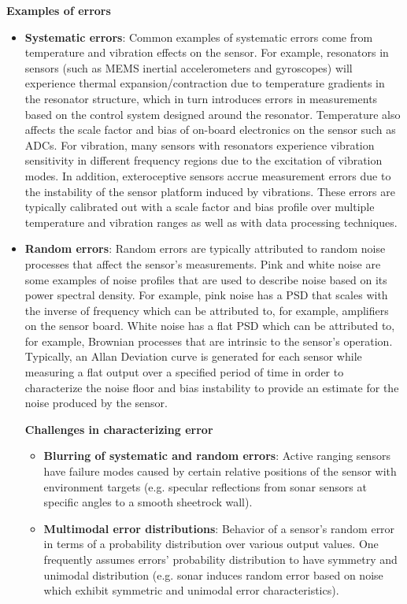\textbf{Examples of errors}
\begin{itemize}
    \item \textbf{Systematic errors}: Common examples of systematic errors come from temperature and vibration effects on the sensor.  For example, resonators in sensors (such as MEMS inertial accelerometers and gyroscopes) will experience thermal expansion/contraction due to temperature gradients in the resonator structure, which in turn introduces errors in measurements based on the control system designed around the resonator.  Temperature also affects the scale factor and bias of on-board electronics on the sensor such as ADCs.  For vibration, many sensors with resonators experience vibration sensitivity in different frequency regions due to the excitation of vibration modes.  In addition, exteroceptive sensors accrue measurement errors due to the instability of the sensor platform induced by vibrations.  These errors are typically calibrated out with a scale factor and bias profile over multiple temperature and vibration ranges as well as with data processing techniques.  
    \item \textbf{Random errors}: Random errors are typically attributed to random noise processes that affect the sensor's measurements.  Pink and white noise are some examples of noise profiles that are used to describe noise based on its power spectral density.  For example, pink noise has a PSD that scales with the inverse of frequency which can be attributed to, for example, amplifiers on the sensor board.  White noise has a flat PSD which can be attributed to, for example, Brownian processes that are intrinsic to the sensor's operation.  Typically, an Allan Deviation curve is generated for each sensor while measuring a flat output over a specified period of time in order to characterize the noise floor and bias instability to provide an estimate for the noise produced by the sensor.    

\textbf{Challenges in characterizing error}
\begin{itemize}
    \item \textbf{Blurring of systematic and random errors}: Active ranging sensors have failure modes caused by certain relative positions of the sensor with environment targets (e.g. specular reflections from sonar sensors at specific angles to a smooth sheetrock wall).
    \item \textbf{Multimodal error distributions}: Behavior of a sensor's random error in terms of a probability distribution over various output values. One frequently assumes errors' probability distribution to have symmetry and unimodal distribution (e.g. sonar induces random error based on noise which exhibit symmetric and unimodal error characteristics).
\end{itemize}


\end{itemize}
